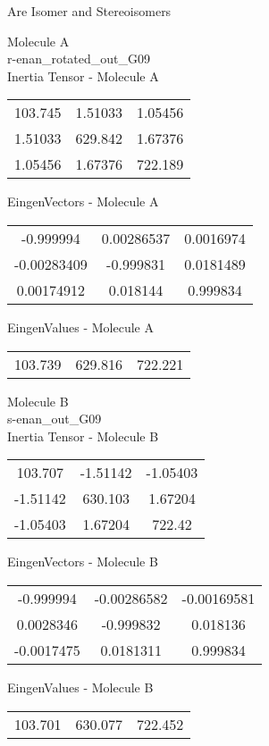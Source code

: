 \begin{center}
\vtab
\vtab
\textcolor{NavyBlue}{\Large Are Isomer and Stereoisomers}
\end{center}
\newpage
\begin{multicols}{2}
\begin{center}
Molecule A \\ 
r-enan\_rotated\_out\_G09
\\
Inertia Tensor - Molecule A \\
\vtab
\begin{tabular}{|c c c|}
103.745	 & 	1.51033	 & 	1.05456	 \\
1.51033	 & 	629.842	 & 	1.67376	 \\
1.05456	 & 	1.67376	 & 	722.189
\end{tabular}

\vtab
 EingenVectors - Molecule A     \\
\vtab
\begin{tabular}{|c c c|}
-0.999994	 & 	0.00286537	 & 	0.0016974	 \\
-0.00283409	 & 	-0.999831	 & 	0.0181489	 \\
0.00174912	 & 	0.018144	 & 	0.999834
\end{tabular}

\vtab
 EingenValues - Molecule A     \\
\vtab
\begin{tabular}{|c c c|}
103.739	 & 	629.816	 & 	722.221
\end{tabular}
\columnbreak

Molecule B \\ 
s-enan\_out\_G09
\\
Inertia Tensor - Molecule B \\
\vtab
\begin{tabular}{|c c c|}
103.707	 & 	-1.51142	 & 	-1.05403	 \\
-1.51142	 & 	630.103	 & 	1.67204	 \\
-1.05403	 & 	1.67204	 & 	722.42
\end{tabular}

\vtab
 EingenVectors - Molecule B     \\
\vtab
\begin{tabular}{|c c c|}
-0.999994	 & 	-0.00286582	 & 	-0.00169581	 \\
0.0028346	 & 	-0.999832	 & 	0.018136	 \\
-0.0017475	 & 	0.0181311	 & 	0.999834
\end{tabular}

\vtab
 EingenValues - Molecule B     \\
\vtab
\begin{tabular}{|c c c|}
103.701	 & 	630.077	 & 	722.452
\end{tabular}

\end{center}
\end{multicols}
